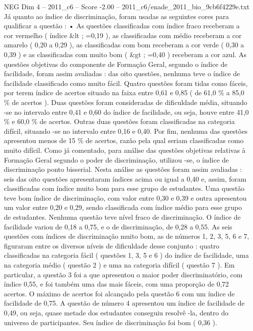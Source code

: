 \begin{textsample}{NEG Dim 4 – 2011\_c6 – Score -2.00 – 2011\_c6/enade\_2011\_bio\_9cb6f4229e.txt}
Já quanto ao índice de discriminação, foram usadas as seguintes cores para qualificar a questão : • As questões classificadas com índice fraco receberam a cor vermelho ( índice \&lt ; =0,19 ), as classificadas com médio receberam a cor amarelo ( 0,20 a 0,29 ), as classificadas com bom receberam a cor verde ( 0,30 a 0,39 ) e as classificadas com muito bom ( \&gt ; =0,40 ) receberam a cor azul.
As questões objetivas do componente de Formação Geral, segundo o índice de facilidade, foram assim avaliadas : das oito questões, nenhuma teve o índice de facilidade classificado como muito fácil.
Quatro questões foram tidas como fáceis, por terem índice de acertos situado na faixa entre 0,61 e 0,85 ( de 61,0 \% a 85,0 \% de acertos ).
Duas questões foram consideradas de dificuldade média, situando -se no intervalo entre 0,41 e 0,60 do índice de facilidade, ou seja, houve entre 41,0 \% e 60,0 \% de acertos.
Outras duas questões foram classificadas na categoria difícil, situando -se no intervalo entre 0,16 e 0,40.
Por fim, nenhuma das questões apresentou menos de 15 \% de acertos, razão pela qual seriam classificadas como muito difícil.
Como já comentado, para análise das questões objetivas relativas à Formação Geral segundo o poder de discriminação, utilizou -se, o índice de discriminação ponto bisserial.
Nesta análise as questões foram assim avaliadas : seis das oito questões apresentaram índices acima ou igual a 0,40 e, assim, foram classificadas com índice muito bom para esse grupo de estudantes.
Uma questão teve bom índice de discriminação, com valor entre 0,30 e 0,39 e outra apresentou um valor entre 0,20 e 0,29, sendo classificada com índice médio para esse grupo de estudantes.
Nenhuma questão teve nível fraco de discriminação.
O índice de facilidade variou de 0,18 a 0,75, e o de discriminação, de 0,28 a 0,55.
As seis questões com índices de discriminação muito bom, as de números 1, 2, 3, 5, 6 e 7, figuraram entre os diversos níveis de dificuldade desse conjunto : quatro classificadas na categoria fácil ( questões 1, 3, 5 e 6 ) do índice de facilidade, uma na categoria médio ( questão 2 ) e uma na categoria difícil ( questão 7 ).
Em particular, a questão 3 foi a que apresentou o maior poder discriminatório, com índice 0,55, e foi também uma das mais fáceis, com uma proporção de 0,72 acertos.
O máximo de acertos foi alcançado pela questão 6 com um índice de facilidade de 0,75.
A questão de número 4 apresentou um índice de facilidade de 0,49, ou seja, quase metade dos estudantes conseguiu resolvê -la, dentro do universo de participantes.
Seu índice de discriminação foi bom ( 0,36 ).

\end{textsample}
